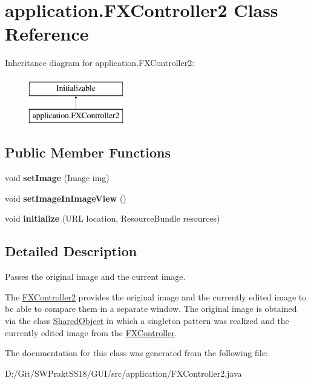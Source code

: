 \hypertarget{classapplication_1_1_f_x_controller2}{}\section{application.\+F\+X\+Controller2 Class Reference}
\label{classapplication_1_1_f_x_controller2}
Inheritance diagram for application.\+F\+X\+Controller2\+:\begin{figure}[H]
\begin{center}
\leavevmode
\includegraphics[height=2.000000cm]{classapplication_1_1_f_x_controller2}
\end{center}
\end{figure}
\subsection*{Public Member Functions}
\begin{DoxyCompactItemize}
\item 
\mbox{\label{classapplication_1_1_f_x_controller2_aabd0ecbee219d6d3a79147a5d1b3fd06}} 
void {\bfseries set\+Image} (Image img)
\item 
\mbox{\label{classapplication_1_1_f_x_controller2_a889afcc4017257a1e172adb2ce87350a}} 
void {\bfseries set\+Image\+In\+Image\+View} ()
\item 
\mbox{\label{classapplication_1_1_f_x_controller2_aa4a46ed76cd926e4d37fdd3e4fe8092e}} 
void {\bfseries initialize} (U\+RL location, Resource\+Bundle resources)
\end{DoxyCompactItemize}


\subsection{Detailed Description}
Passes the original image and the current image.

The \mbox{\hyperlink{classapplication_1_1_f_x_controller2}{F\+X\+Controller2}} provides the original image and the currently edited image to be able to compare them in a separate window. The original image is obtained via the class \mbox{\hyperlink{classapplication_1_1_shared_object}{Shared\+Object}} in which a singleton pattern was realized and the currently edited image from the \mbox{\hyperlink{classapplication_1_1_f_x_controller}{F\+X\+Controller}}. 

The documentation for this class was generated from the following file\+:\begin{DoxyCompactItemize}
\item 
D\+:/\+Git/\+S\+W\+Prakt\+S\+S18/\+G\+U\+I/src/application/F\+X\+Controller2.\+java\end{DoxyCompactItemize}
